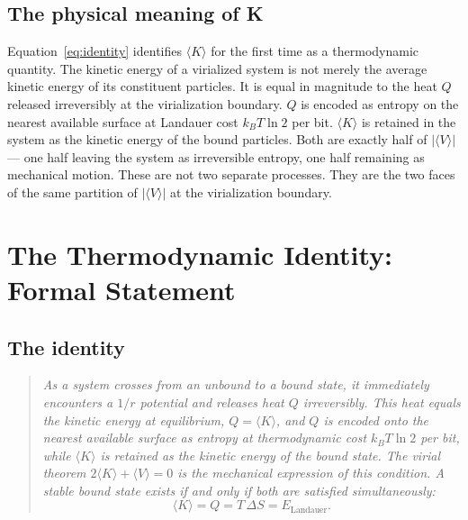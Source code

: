 \documentclass[12pt,a4paper]{article}
\begin{document}
\subsection{The physical meaning of K}

Equation~\ref{eq:identity} identifies $\langle K \rangle$ for the first
time as a thermodynamic quantity. The kinetic energy of a virialized system
is not merely the average kinetic energy of its constituent particles. It
is equal in magnitude to the heat $Q$ released irreversibly at the
virialization boundary. $Q$ is encoded as entropy on the nearest available
surface at Landauer cost $k_B T \ln 2$ per bit. $\langle K \rangle$ is
retained in the system as the kinetic energy of the bound particles. Both
are exactly half of $|\langle V \rangle|$ --- one half leaving the system
as irreversible entropy, one half remaining as mechanical motion. These are
not two separate processes. They are the two faces of the same partition of
$|\langle V \rangle|$ at the virialization boundary.

\section{The Thermodynamic Identity: Formal Statement}
\label{sec:statement}

\subsection{The identity}

\begin{quote}
\textit{As a system crosses from an unbound to a bound state, it
immediately encounters a $1/r$ potential and releases heat $Q$
irreversibly. This heat equals the kinetic energy at equilibrium,
$Q = \langle K \rangle$, and $Q$ is encoded onto the nearest available
surface as entropy at thermodynamic cost $k_B T \ln 2$ per bit, while
$\langle K \rangle$ is retained as the kinetic energy of the bound state.
The virial theorem $2\langle K \rangle + \langle V \rangle = 0$ is the
mechanical expression of this condition. A stable bound state exists if
and only if both are satisfied simultaneously:}
\begin{equation}
\langle K \rangle = Q = T\,\Delta S = E_\mathrm{Landauer}.
\label{eq:identity_formal}
\end{equation}
\end{quote}
\end{document}
